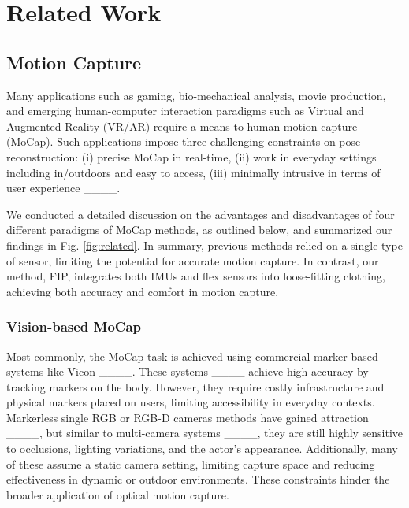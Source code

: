 \section{Related Work}
\subsection{Motion Capture}
Many applications such as gaming, bio-mechanical analysis, movie production, and emerging human-computer interaction paradigms such as Virtual and Augmented Reality (VR/AR) require a means to human motion capture (MoCap). Such applications impose three challenging constraints on pose reconstruction: (i) precise MoCap in real-time, (ii) work in everyday settings including in/outdoors and easy to access, (iii) minimally intrusive in terms of user experience ____.

We conducted a detailed discussion on the advantages and disadvantages of four different paradigms of MoCap methods, as outlined below, and summarized our findings in Fig. \ref{fig:related}. In summary, previous methods relied on a single type of sensor, limiting the potential for accurate motion capture. In contrast, our method, FIP, integrates both IMUs and flex sensors into loose-fitting clothing, achieving both accuracy and comfort in motion capture.

\subsubsection{Vision-based MoCap} Most commonly, the MoCap task is achieved using commercial marker-based systems like 
Vicon ____. These systems ____ achieve high accuracy by tracking markers on the body. However, they require costly infrastructure and physical markers placed on users, limiting accessibility in everyday contexts. Markerless single RGB or RGB-D cameras methods have gained attraction ____, but similar to multi-camera systems ____, they are still highly sensitive to occlusions, lighting variations, and the actor's appearance. Additionally, many of these assume a static camera setting, limiting capture space and reducing effectiveness in dynamic or outdoor environments. These constraints hinder the broader application of optical motion capture. 


